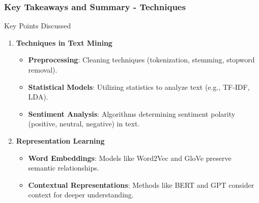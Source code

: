\documentclass[aspectratio=169]{beamer}
\begin{document}
\begin{frame}[fragile]
    \frametitle{Key Takeaways and Summary - Techniques}

    \begin{block}{Key Points Discussed}
        \begin{enumerate}
            \item \textbf{Techniques in Text Mining}
                \begin{itemize}
                    \item \textbf{Preprocessing}: Cleaning techniques (tokenization, stemming, stopword removal).
                    \item \textbf{Statistical Models}: Utilizing statistics to analyze text (e.g., TF-IDF, LDA).
                    \item \textbf{Sentiment Analysis}: Algorithms determining sentiment polarity (positive, neutral, negative) in text.
                \end{itemize}
            \item \textbf{Representation Learning}
                \begin{itemize}
                    \item \textbf{Word Embeddings}: Models like Word2Vec and GloVe preserve semantic relationships.
                    \item \textbf{Contextual Representations}: Methods like BERT and GPT consider context for deeper understanding.
                \end{itemize}
        \end{enumerate}
    \end{block}

\end{frame}
\end{document}

